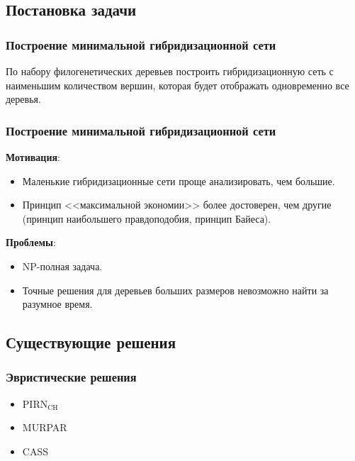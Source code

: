 \documentclass[hyperref={unicode}]{beamer}
\begin{document}
\subsection{Постановка задачи}

\begin{frame}
\frametitle{Построение минимальной гибридизационной сети}

По набору филогенетических деревьев построить гибридизационную сеть с наименьшим количеством вершин, которая будет отображать одновременно все деревья.

\end{frame}

%
%

\begin{frame}
\frametitle{Построение минимальной гибридизационной сети}

\textbf{Мотивация}: 
\begin{itemize}
	\item Маленькие гибридизационные сети проще анализировать, чем большие.
	\item Принцип <<максимальной экономии>> более достоверен, чем другие (принцип наибольшего правдоподобия, принцип Байеса).
\end{itemize}


\textbf{Проблемы}:
\begin{itemize}
	\item NP-полная задача.
	\item Точные решения для деревьев больших размеров невозможно найти за разумное время.
\end{itemize}

\end{frame}

\subsection{Существующие решения}

\begin{frame}
\frametitle{Эвристические решения}

\begin{itemize}
	\item $\mathrm{PIRN_{CH}}$
	\item MURPAR
	\item CASS
\end{itemize}

\end{frame}
\end{document}

